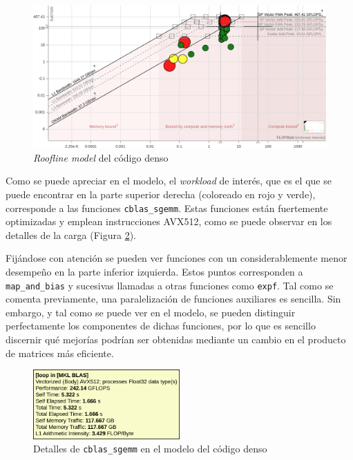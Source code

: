 \begin{figure}[h!]
    \centering
    \includegraphics[width=\textwidth]{img/rooflines/roofline_dense.png}
    \caption{\textit{Roofline model} del código denso}
    \label{fig:roofline_dense}
\end{figure}

Como se puede apreciar en el modelo, el \textit{workload} de interés, que es el que se puede encontrar en la parte superior derecha (coloreado en rojo y verde), corresponde a las funciones \texttt{cblas\_sgemm}. Estas funciones están fuertemente optimizadas y emplean instrucciones AVX512, como se puede observar en los detalles de la carga (Figura \ref{fig:roofline_dense_details}).

Fijándose con atención se pueden ver funciones con un considerablemente menor desempeño en la parte inferior izquierda. Estos puntos corresponden a \texttt{map\_and\_bias} y sucesivas llamadas a otras funciones como \texttt{expf}. Tal como se comenta previamente, una paralelización de funciones auxiliares es sencilla. Sin embargo, y tal como se puede ver en el modelo, se pueden distinguir perfectamente los componentes de dichas funciones, por lo que es sencillo discernir qué mejorías podrían ser obtenidas mediante un cambio en el producto de matrices más eficiente.    

\begin{figure}[h!]
    \centering
    \includegraphics[width=0.5\textwidth]{img/rooflines/roofline_dense_details.png}
    \caption{Detalles de \texttt{cblas\_sgemm} en el modelo del código denso}
    \label{fig:roofline_dense_details}
\end{figure}

